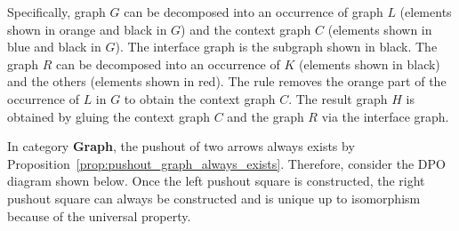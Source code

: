 Specifically, graph $G$ can be decomposed into an occurrence of graph $L$ (elements shown in orange and black in $G$) and the context graph $C$ (elements shown in blue and black in $G$). The interface graph is the subgraph shown in black.
The graph $R$ can be decomposed into an occurrence of $K$ (elements shown in black) and the others (elements shown in red).
The rule removes the orange part of the occurrence of $L$ in $G$ to obtain the context graph $C$. 
The result graph $H$ is obtained by gluing the context graph $C$ and the graph $R$ via the interface graph.


In category \textbf{Graph}, the pushout of two arrows always exists by Proposition~\ref{prop:pushout_graph_always_exists}. Therefore, consider the DPO diagram shown
below.
 Once the left pushout square is constructed, the right pushout square can always be constructed and is unique up to isomorphism because of the universal property.
\begin{center}
    \end{center}

